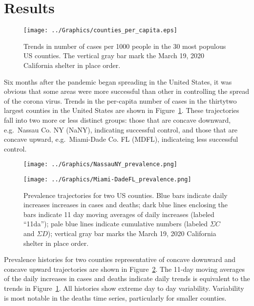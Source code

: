 \documentclass[12pt,letterpaper]{article}
\newcommand\EG{e.g.\ }
\begin{document}
\section*{Results}

\begin{figure}
\begin{center}
\texttt{[image: ../Graphics/counties\_per\_capita.eps]}
\end{center}
\caption{\label{fig:percap}
Trends in number of cases per 1000 people in the 30 most populous US
counties.
The vertical gray bar mark the March 19, 2020 California shelter in place order.
}
\end{figure}


Six months after the pandemic began spreading in the United States, it
was obvious that some areas were more successful than other
in controlling the spread of the corona virus.
Trends in the per-capita number of cases in the thirtytwo largest
counties in the
United States are shown in Figure~\ref{fig:percap}.
These trajectories fall into two more or less distinct groups: those
that are concave downward, \EG Nassau Co. NY (NaNY), indicating
successful control, and those that are
concave upward, \EG Miami-Dade Co. FL (MDFL), indicateing less
successful control.


\begin{figure}
{\scriptsize
\begin{center}
\texttt{[image: ../Graphics/NassauNY\_prevalence.png]}
 
\vspace{0.25truein}

\texttt{[image: ../Graphics/Miami-DadeFL\_prevalence.png]}
\end{center}
}
\caption{\label{fig:prev}
Prevalence trajectories for two US counties.
Blue bars indicate daily increases increases in cases and deaths;
dark blue lines enclosing the bars indicate 11 day moving averages of
daily increases (labeled ``11da'');
pale blue lines indicate cumulative numbers (labeled $\Sigma C$ and
$\Sigma D$); 
vertical gray bar marks the March 19, 2020 California shelter in place order.
}
\end{figure}

Prevalence histories for two counties representative of concave
downward and concave upward trajectories are shown in
Figure~\ref{fig:prev}. The 11-day moving averages of the daily
increases in cases and deaths indicate daily trends is equivalent to
the trends in Figure~\ref{fig:percap}.
All histories show extreme day to day variability.
Variability is most notable in the deaths
time series, particularly for smaller counties.
\end{document}
